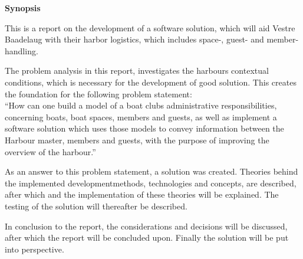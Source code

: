 \begin{center}\textbf{Synopsis}\\ \end{center}

This is a report on the development of a software solution, which will aid Vestre Baadelaug with their harbor logistics, which includes space-, guest- and member-handling.

The problem analysis in this report, investigates the harbours contextual conditions, which is necessary for the development of good solution. This creates the foundation for the following problem statement:\\

\enquote{How can one build a model of a boat clubs administrative responsibilities, concerning boats, boat spaces, members and guests, as well as implement a software solution which uses those models to convey information between the Harbour master, members and guests, with the purpose of improving the overview of the harbour.}

As an answer to this problem statement, a solution was created. Theories behind the implemented developmentmethods, technologies and concepts, are described, after which and the implementation of these theories will be explained. The testing of the solution will thereafter be described.

In conclusion to the report, the considerations and decisions will be discussed, after which the report will be concluded upon. Finally the solution will be put into perspective.